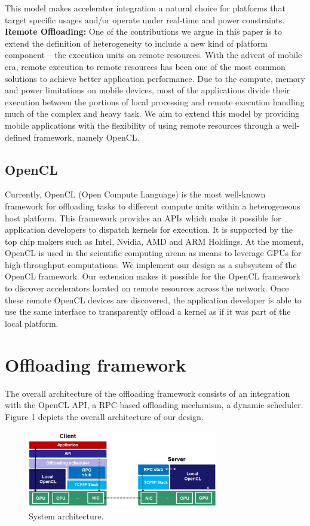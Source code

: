 \documentclass[conference]{IEEEtran}
\begin{document}
%
This model makes accelerator integration a natural choice for platforms
that target specific usages and/or operate under real-time and power
constraints.\\
\textbf{Remote Offloading:} One of the contributions we argue in this
paper is to extend the definition of heterogeneity to include a new
kind of platform component -- the execution units on remote resources.
%
With the advent of mobile era, remote execution to remote resources
has been one of the most common solutions to achieve better application
performance.
%
Due to the compute, memory and power limitations on mobile devices, most
of the applications divide their execution between the portions of local
processing and remote execution handling much of the complex and heavy
task.
%
We aim to extend this model by providing mobile applications with the
flexibility of using remote resources through a well-defined framework,
namely OpenCL.
%
\subsection{OpenCL}
Currently, OpenCL (Open Compute Language) is the most well-known
framework for offloading tasks to different compute units within a
heterogeneous host platform.
%
This framework provides an APIs which make it possible for application
developers to dispatch kernels for execution.
%
It is supported by the top chip makers such as Intel, Nvidia, AMD and
ARM Holdings.
%
At the moment, OpenCL is used in the scientific computing arena as means
to leverage GPUs for high-throughput computations.
%
We implement our design as a subsystem of the OpenCL framework.
%
Our extension makes it possible for the OpenCL framework to discover
accelerators located on remote resources across the network.
%
Once these remote OpenCL devices are discovered, the application
developer is able to use the same interface to transparently offload a
kernel as if it was part of the local platform.
%
\section{Offloading framework}
The overall architecture of the offloading framework consists of an integration
with the OpenCL API, a RPC-based offloading mechanism, a dynamic scheduler.
%
Figure 1 depicts the overall architecture of our design.
%
\begin{figure}
\centering
\includegraphics[height=3.4cm, width=8.3cm]{Figure/figure1}
\caption{System architecture.}
\end{figure}
%
\end{document}
